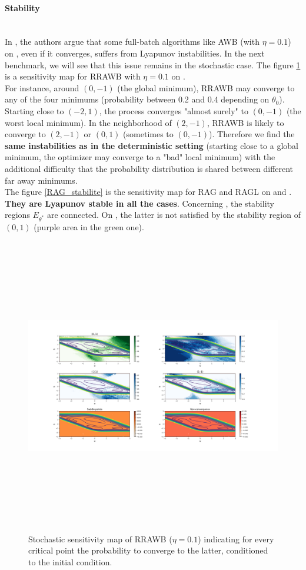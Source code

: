 \paragraph{Stability}
~~\\
In \cite{Bilel}, the authors argue that some full-batch algorithms like AWB (with $\eta=0.1$) on \polyThree, even if it converges, suffers from Lyapunov instabilities. 
In the next benchmark, we will see that this issue remains in the stochastic case. The figure \ref{RRAWB_polyThree} is a sensitivity map for RRAWB with $\eta=0.1$ on \polyThree. \\
For instance, around $(0,-1)$ (the global minimum), RRAWB may converge to any of the four minimums (probability between 0.2 and 0.4 depending on $\theta_0$). Starting close to $(-2,1)$, the process converges "almost surely" to $(0,-1)$ (the worst local minimum). In the neighborhood of $(2,-1)$, RRAWB is likely to converge to $(2,-1)$ or $(0,1)$ (sometimes to $(0,-1)$). Therefore we find the \textbf{same instabilities as in the deterministic setting} (starting close to a global minimum, the optimizer may converge to a "bad" local minimum) with the additional difficulty that the probability distribution is shared between different far away minimums. \\
The figure \ref{RAG_stabilite} is the sensitivity map for RAG and RAGL on \polyTwo and \polyThree. \textbf{They are Lyapunov stable in all the cases}. Concerning \polyTwo, the stability regions $E_{\theta^*}$ are connected. On \polyThree, the latter is not satisfied by the stability region of $(0,1)$ (purple area in the green one). 

\begin{figure}[h!]
	\centering
	\includegraphics[width=\textwidth, height=13cm]{chapitre5_img/RRAWB_polyThree.png}
	\caption{Stochastic sensitivity map of RRAWB ($\eta=0.1$) indicating for every critical point the probability to converge to the latter, conditioned to the initial condition.}
	\label{RRAWB_polyThree}
\end{figure}

